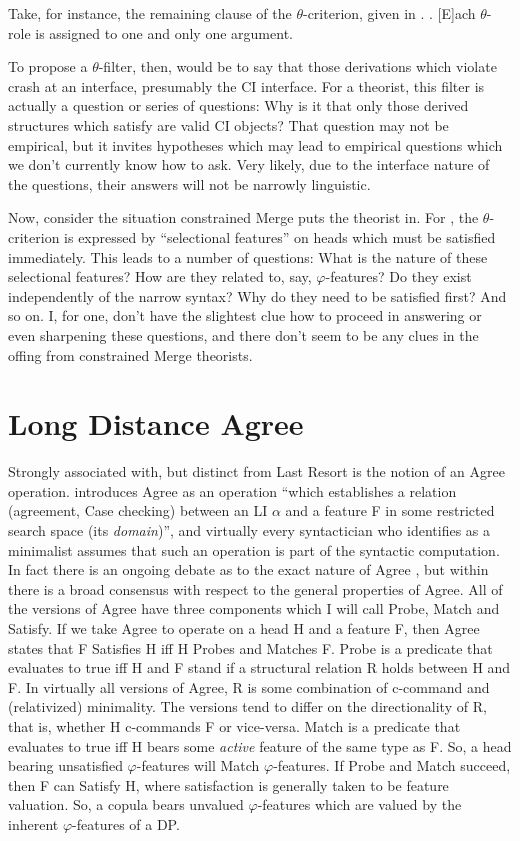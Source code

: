 \documentclass[MilwayThesis]{subfiles}
\begin{document}
Take, for instance, the remaining clause of the $\theta$-criterion, given in \Next.
\ex. [E]ach $\theta$-role is assigned to one and only one argument. \parencite[36]{chomsky1981lectures}

To propose a $\theta$-filter, then, would be to say that those derivations which violate \Last crash at an interface, presumably the CI interface.
For a theorist, this filter is actually a question or series of questions: Why is it that only those derived structures which satisfy \Last are valid CI objects?
That question may not be empirical, but it invites hypotheses which may lead to empirical questions which we don't currently know how to ask.
Very likely, due to the interface nature of the questions, their answers will not be narrowly linguistic.

Now, consider the situation constrained Merge puts the theorist in.
For \textcite{frampton2008crash}, the $\theta$-criterion is expressed by ``selectional features'' on heads which must be satisfied immediately.
This leads to a number of questions: What is the nature of these selectional features?
How are they related to, say, $\varphi$-features?
Do they exist independently of the narrow syntax?
Why do they need to be satisfied first?
And so on.
I, for one, don't have the slightest clue how to proceed in answering or even sharpening these questions, and there don't seem to be any clues in the offing from constrained Merge theorists.
\section{Long Distance Agree}
Strongly associated with, but distinct from Last Resort is the notion of an Agree operation.
\textcite[101]{chomsky2000minimalist} introduces Agree as an operation ``which establishes a relation (agreement, Case checking) between an LI $\alpha$ and a feature F in some restricted search space (its \textit{domain})'', and virtually every syntactician who identifies as a minimalist assumes that such an operation is part of the syntactic computation.
In fact there is an ongoing debate as to the exact nature of Agree \parencite{zeijlstra2012there,preminger2013thats,bjorkman2014upward}, but within there is a broad consensus with respect to the general properties of Agree.
All of the versions of Agree have three components which I will call Probe, Match and Satisfy.
If we take Agree to operate on a head H and a feature F, then Agree states that F Satisfies H iff H Probes and Matches F.
Probe is a predicate that evaluates to true iff H and F stand if a structural relation R holds between H and F.
In virtually all versions of Agree, R is some combination of c-command and (relativized) minimality.
The versions tend to differ on the directionality of R, that is, whether H c-commands F or vice-versa.
Match is a predicate that evaluates to true iff H bears some \textit{active} feature of the same type as F.
So, a head bearing unsatisfied $\varphi$-features will Match $\varphi$-features.
If Probe and Match succeed, then F can Satisfy H, where satisfaction is generally taken to be feature valuation.
So, a copula bears unvalued $\varphi$-features which are valued by the inherent $\varphi$-features of a DP.
\end{document}

